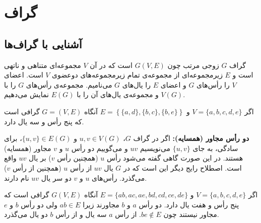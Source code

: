 \chapter{گراف}
\thispagestyle{empty}

\section{آشنایی با گراف‌ها}
گراف $G$ زوجی مرتب چون
$G(V,E)$
است که در آن $V$ مجموعه‌ای متناهی و ناتهی است و $E$ زیرمجموعه‌ای از مجموعه‌ی تمام زیرمجموعه‌های دوعضوی $V$ است. اعضای $V$ را رأس‌های $G$ و اعضای $E$ را یال‌های $G$ می‌نامیم. مجموعه‌ی رأس‌های $G$ را با
$V(G)$
و مجموعه‌ی یال‌های آن را با
$E(G)$
نمایش می‌دهیم.
\begin{example}
	اگر
	$V=\{a,b,c,d,e\}$
	و
	$E=\left\{\{a,d\},\{b,c\},\{b,e\}\right\}$
	آنگاه
	$G=(V,E)$
	گرافی است که پنج رأس و سه یال دارد.
\end{example}

\textbf{دو رأس مجاور (همسایه):}
اگر در گراف $G$،
$u,v \in V(G)$
و
$\{u,v\} \in E(G)$،
برای سادگی، به جای
$\{u,v\}$
می‌نویسیم $uv$ و می‌گوییم دو رأس $u$ و $v$ مجاور (همسایه) هستند. در این صورت گاهی گفته می‌شود رأس $u$ (همچنین رأس $v$) بر یال $uv$ واقع است. اصطلاح رایج دیگر این است که در $G$ یال $uv$ از رأس $u$ (همچنین از رأس $v$) می‌گذرد. رأس‌های $u$ و $v$ دو سر یال $uv$ نام دارند.
\begin{example}
	اگر
	$V=\{a,b,c,d,e\}$
	و
	$E=\{ab,ac,ae,bd,cd,ce,de\}$
	آنگاه
	$G(V,E)$
	گرافی است که پنج رأس و هفت یال دارد. دو رأس $a$ و $b$ مجاورند زیرا
	$ab \in E$
	ولی دو رأس $b$ و $e$ مجاور نیستند چون
	$be \notin E$.
	از رأس $a$ سه یال و از رأس $b$ دو یال می‌گذرد.
\end{example}


